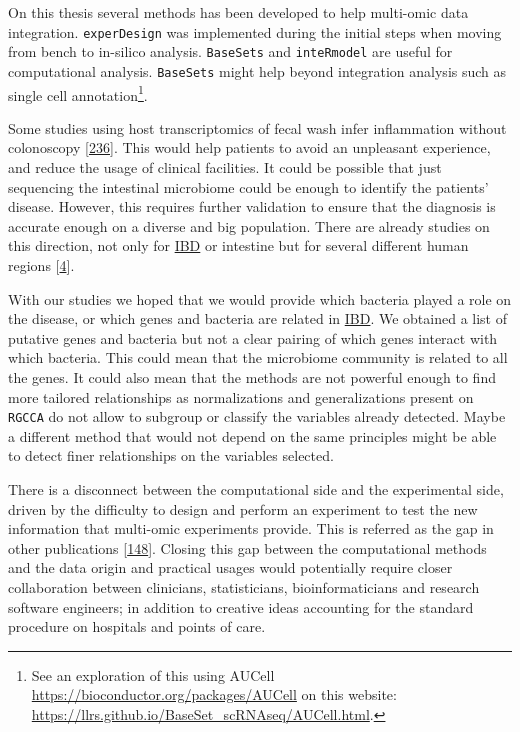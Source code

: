 \documentclass[
  12pt,
  a4paper,
  twoside,
  openright]{book}
\begin{document}
On this thesis several methods has been developed to help multi-omic data integration.
\texttt{experDesign} was implemented during the initial steps when moving from bench to in-silico analysis.
\texttt{BaseSets} and \texttt{inteRmodel} are useful for computational analysis.
\texttt{BaseSets} might help beyond integration analysis such as single cell annotation\footnote{See an exploration of this using AUCell \url{https://bioconductor.org/packages/AUCell} on this website: \url{https://llrs.github.io/BaseSet_scRNAseq/AUCell.html}.}.

Some studies using host transcriptomics of fecal wash infer inflammation without colonoscopy {[}\protect\hyperlink{ref-ungar2022}{236}{]}.
This would help patients to avoid an unpleasant experience, and reduce the usage of clinical facilities.
It could be possible that just sequencing the intestinal microbiome could be enough to identify the patients' disease.
However, this requires further validation to ensure that the diagnosis is accurate enough on a diverse and big population.
There are already studies on this direction, not only for \protect\hyperlink{acronyms_IBD}{IBD} or intestine but for several different human regions {[}\protect\hyperlink{ref-humanmicrobiomeprojectconsortium2012}{4}{]}.

With our studies we hoped that we would provide which bacteria played a role on the disease, or which genes and bacteria are related in \protect\hyperlink{acronyms_IBD}{IBD}.
We obtained a list of putative genes and bacteria but not a clear pairing of which genes interact with which bacteria.
This could mean that the microbiome community is related to all the genes.
It could also mean that the methods are not powerful enough to find more tailored relationships as normalizations and generalizations present on \texttt{RGCCA} do not allow to subgroup or classify the variables already detected.
Maybe a different method that would not depend on the same principles might be able to detect finer relationships on the variables selected.

There is a disconnect between the computational side and the experimental side, driven by the difficulty to design and perform an experiment to test the new information that multi-omic experiments provide.
This is referred as the gap in other publications {[}\protect\hyperlink{ref-sudhakar2022}{148}{]}.
Closing this gap between the computational methods and the data origin and practical usages would potentially require closer collaboration between clinicians, statisticians, bioinformaticians and research software engineers; in addition to creative ideas accounting for the standard procedure on hospitals and points of care.
\end{document}

